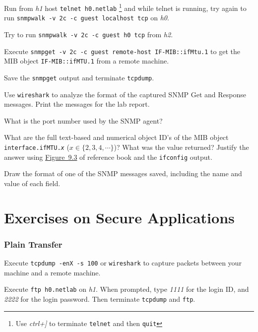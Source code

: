 \documentclass{../UTNetLab}
\begin{document}
    Run from \textit{h1} host \lstinline[emph={h0,netlab}]{telnet h0.netlab} \footnote{Use \textit{ctrl+]} to terminate \lstinline{telnet} and then \lstinline{quit}} and while telnet is running, try again to run \lstinline{snmpwalk -v 2c -c guest localhost tcp} on \textit{h0}.

    Try to run \lstinline[emph={h0}]{snmpwalk -v 2c -c guest h0 tcp} from \textit{h2}.

    Execute \lstinline[emph={your-host, remote-host}]{snmpget -v 2c -c guest remote-host IF-MIB::ifMtu.1} to get the MIB object \texttt{IF-MIB::ifMTU.1} from a remote machine.

    Save the \lstinline{snmpget} output and terminate \lstinline{tcpdump}.

    Use \lstinline{wireshark} to analyze the format of the captured SNMP Get and Response messages.
    Print the messages for the lab report.
    
    \begin{report}
    \item What is the port number used by the SNMP agent?
    
    \item What are the full text-based and numerical object ID’s of the MIB object \texttt{interface.ifMTU.\textit{x}} ($x \in \{2,3,4,\cdots\}$)? What was the value returned? Justify the answer using \hyperref[fig:9.3]{Figure~9.3} of reference book and the \lstinline{ifconfig} output.
    
    \item Draw the format of one of the SNMP messages saved, including the name and value of each field.
    \end{report}

\part{Exercises on Secure Applications}
    
\section{Plain Transfer}
    Execute \lstinline{tcpdump -enX -s 100} or \lstinline{wireshark} to capture packets between your machine and a remote machine.

    Execute \lstinline[emph={h0,netlab}]{ftp h0.netlab} on \textit{h1}.
    When prompted, type \textit{1111} for the login ID, and \textit{2222} for the login password.
    Then terminate \lstinline{tcpdump} and \lstinline{ftp}.
\end{document}
